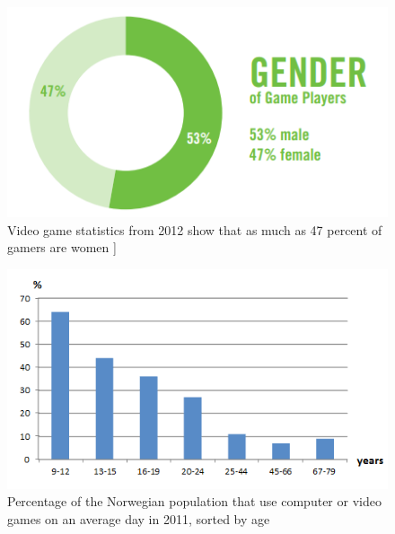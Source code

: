 \begin{figure}
\begin{center}
\includegraphics[scale=0.7]{gendergameplayers}
\caption[Gender of gameplayer]{Video game statistics from 2012 show that as much as 47 percent of gamers are women \cite{statistics2012real}]}
\label{fig:GenderGamePlayers}
\end{center}
\end{figure}
\begin{figure}
\begin{center}
\includegraphics[scale=0.9]{gamestatisticsnorway}
\caption[Use of computer or video games, Norway, 2011]{Percentage of the Norwegian population that use computer or video games on an average day in 2011, sorted by age \cite{ssb2011}}
\label{fig:GameStatisticsNorway}
\end{center}
\end{figure}
       
